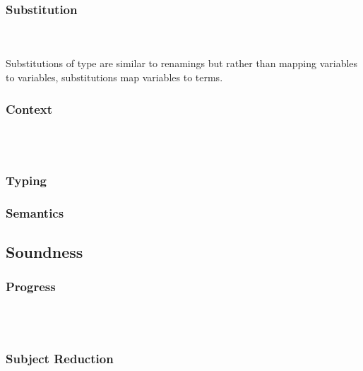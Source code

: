 \subsubsection{Substitution}\hfill\\\\
Substitutions  of type    are similar to renamings but rather than mapping variables to variables, substitutions map variables to terms.
\FSub

\subsubsection{Context}\hfill\\\\

\subsubsection{Typing}
\subsubsection{Semantics}

\subsection{Soundness}
\subsubsection{Progress}\hfill\\\\
\subsubsection{Subject Reduction}
